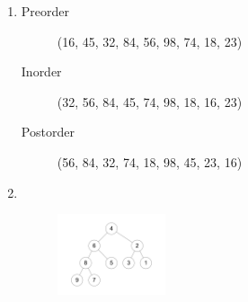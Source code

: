 \documentclass[11pt,a4paper]{article}
\begin{document}
\begin{loesung}
    \begin{enumerate}
        \item
        \begin{description}
            \item[Preorder] (16, 45, 32, 84, 56, 98, 74, 18, 23)
            \item[Inorder] (32, 56, 84, 45, 74, 98, 18, 16, 23)
            \item[Postorder] (56, 84, 32, 74, 18, 98, 45, 23, 16)
        \end{description}
        \item \ \\
        \begin{figure}[h!]
            \centering
            \includegraphics[width=0.3\textwidth]{img/4c}
        \end{figure}
        \FloatBarrier


\end{enumerate}
\end{loesung}
\end{document}
